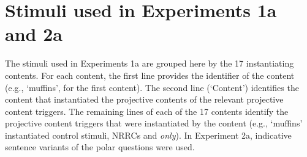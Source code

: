 \documentclass[11pt,fleqn]{article}
\newcommand{\6}{\mbox{$[\hspace*{-.6mm}[$}}
\newcommand{\9}{\mbox{$]\hspace*{-.6mm}]$}}
\begin{document}
\appendix

\section{Stimuli used in Experiments 1a and 2a}\label{a-exp1a-2a-stimuli}

The stimuli used in Experiments 1a are grouped here by the 17 instantiating contents. For each content, the first line provides the identifier of the content (e.g., `muffins', for the first content). The second line (`Content') identifies the content that instantiated the projective contents of the relevant projective content triggers. The remaining lines of each of the 17 contents identify the projective content triggers that were instantiated by the content (e.g., `muffins' instantiated control stimuli, NRRCs and {\em only}). In Experiment 2a, indicative sentence variants of the polar questions were used.
\end{document}
